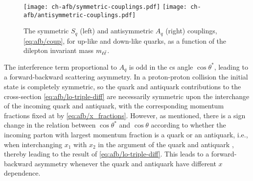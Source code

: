  
\begin{figure}
  \centering
  \texttt{[image: ch-afb/symmetric-couplings.pdf]}
  \texttt{[image: ch-afb/antisymmetric-couplings.pdf]}
  \caption{The symmetric $S_q$ (left) and antisymmetric $A_q$ (right)
    couplings, \cref{eq:afb/coup}, for up-like and
    down-like quarks, as a function of 
 the dilepton invariant mass $m_{\ell\bar{\ell}}$.
  }
  \label{fig:afb/lo-couplings}
\end{figure}

The interference term proportional to
$A_q$ is odd in the \acrlong{cs} angle $\cos\theta^*$, leading to a forward-backward
scattering asymmetry.
%
In a proton-proton collision the initial state is completely
symmetric, so the quark and antiquark contributions to the
cross-section \cref{eq:afb/lo-triple-diff} are necessarily symmetric
upon the interchange of the incoming quark and antiquark, with the
corresponding momentum fractions fixed at \lo by
\cref{eq:afb/x_fractions}.
%
However, as mentioned, there
is a sign change in the relation between $\cos\theta^*$ and
$\cos\theta$ according to whether the incoming parton with largest
momentum fraction is a quark or an antiquark, i.e.,
when interchanging
$x_1$ with $x_2$ in the argument of the quark and antiquark \pdfs,
thereby leading to the result of  \cref{eq:afb/lo-triple-diff}.
%
This leads
to a forward-backward asymmetry whenever the quark and antiquark
\pdfs have different $x$ dependence.

